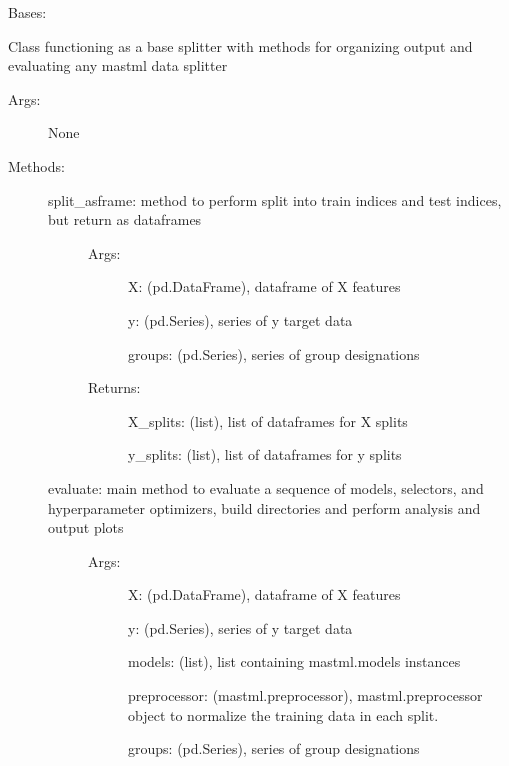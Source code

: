 \documentclass[letterpaper,10pt,english]{sphinxmanual}
\begin{document}
\begin{fulllineitems}
\label{\detokenize{api/mastml.data_splitters.BaseSplitter:mastml.data_splitters.BaseSplitter}}
Bases: 

Class functioning as a base splitter with methods for organizing output and evaluating any mastml data splitter
\begin{description}
\item[{Args:}] \leavevmode
None

\item[{Methods:}] \leavevmode\begin{description}
\item[{split\_asframe: method to perform split into train indices and test indices, but return as dataframes}] \leavevmode\begin{description}
\item[{Args:}] \leavevmode
X: (pd.DataFrame), dataframe of X features

y: (pd.Series), series of y target data

groups: (pd.Series), series of group designations

\item[{Returns:}] \leavevmode
X\_splits: (list), list of dataframes for X splits

y\_splits: (list), list of dataframes for y splits

\end{description}

\item[{evaluate: main method to evaluate a sequence of models, selectors, and hyperparameter optimizers, build directories and perform analysis and output plots}] \leavevmode\begin{description}
\item[{Args:}] \leavevmode
X: (pd.DataFrame), dataframe of X features

y: (pd.Series), series of y target data

models: (list), list containing mastml.models instances

preprocessor: (mastml.preprocessor), mastml.preprocessor object to normalize the training data in each split.

groups: (pd.Series), series of group designations


\end{description}
\end{description}
\end{description}
\end{fulllineitems}
\end{document}
